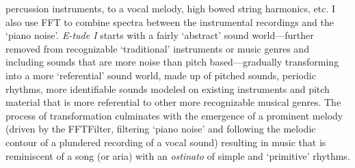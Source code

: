 percussion instruments, to a vocal melody, high bowed string harmonics, etc. I also use FFT to combine spectra between the instrumental recordings and the `piano noise'. \emph{E-tude I} starts with a fairly `abstract' sound world---further removed from recognizable `traditional' instruments or music genres and including sounds that are more noise than pitch based---gradually transforming into a more `referential' sound world, made up of pitched sounds, periodic rhythms, more identifiable sounds modeled on existing instruments and pitch material that is more referential to other more recognizable musical genres. The process of transformation culminates with the emergence of a prominent melody (driven by the FFTFilter, filtering `piano noise' and following the melodic contour of a plundered recording of a vocal sound) resulting in music that is reminiscent of a song (or aria) with an \emph{ostinato} of simple and `primitive' rhythms.

